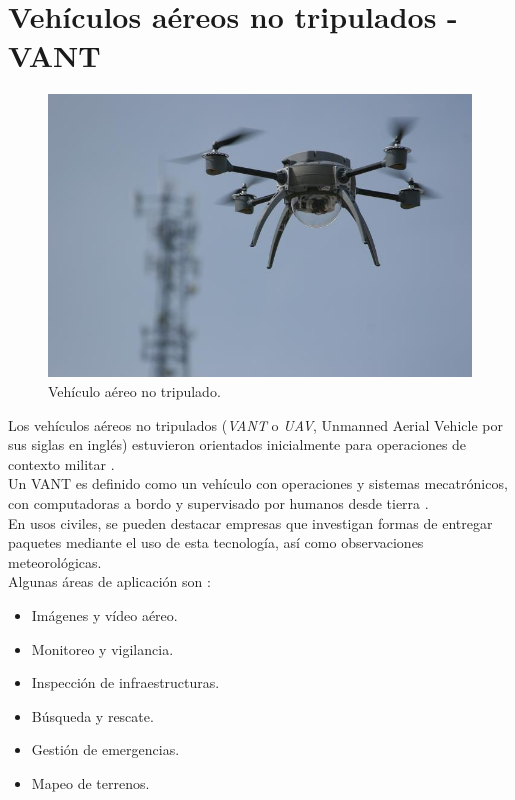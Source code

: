 \section{Vehículos aéreos no tripulados - VANT}

\begin{figure}[H]
\centering
\includegraphics[scale=0.75]{Figures/UAV}
\caption[Vehículo aéreo no tripulado.]{Vehículo aéreo no tripulado\footnotemark.}
\label{fig:UAV}
\end{figure}


Los vehículos aéreos no tripulados (\textit{VANT} o \textit{UAV}, Unmanned Aerial Vehicle por sus siglas en inglés) estuvieron orientados inicialmente para operaciones de contexto militar \citep{fahlstrom2012introduction}.\\

Un VANT es definido como un vehículo con operaciones y sistemas mecatrónicos, con computadoras a bordo y supervisado por humanos desde tierra \citep{haluani2015tecnologia}.\\

En usos civiles, se pueden destacar empresas que investigan formas de entregar paquetes mediante el uso de esta tecnología, así como observaciones meteorológicas.\\

Algunas áreas de aplicación son \citep{addati2014introduccion}:

\begin{itemize}
\item Imágenes y vídeo aéreo.
\item Monitoreo y vigilancia.
\item Inspección de infraestructuras.
\item Búsqueda y rescate.
\item Gestión de emergencias.
\item Mapeo de terrenos.
\end{itemize}

